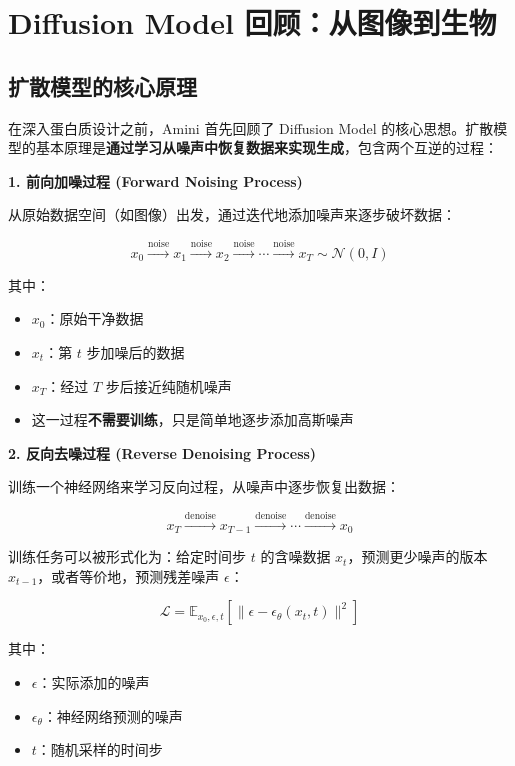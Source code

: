 \section{Diffusion Model 回顾：从图像到生物}

\subsection{扩散模型的核心原理}

在深入蛋白质设计之前，Amini 首先回顾了 Diffusion Model 的核心思想。扩散模型的基本原理是\textbf{通过学习从噪声中恢复数据来实现生成}，包含两个互逆的过程：

\textbf{1. 前向加噪过程 (Forward Noising Process)}

从原始数据空间（如图像）出发，通过迭代地添加噪声来逐步破坏数据：

$$x_0 \xrightarrow{\text{noise}} x_1 \xrightarrow{\text{noise}} x_2 \xrightarrow{\text{noise}} \cdots \xrightarrow{\text{noise}} x_T \sim \mathcal{N}(0, I)$$

其中：
\begin{itemize}
    \item $x_0$：原始干净数据
    \item $x_t$：第 $t$ 步加噪后的数据
    \item $x_T$：经过 $T$ 步后接近纯随机噪声
    \item 这一过程\textbf{不需要训练}，只是简单地逐步添加高斯噪声
\end{itemize}

\textbf{2. 反向去噪过程 (Reverse Denoising Process)}

训练一个神经网络来学习反向过程，从噪声中逐步恢复出数据：

$$x_T \xrightarrow{\text{denoise}} x_{T-1} \xrightarrow{\text{denoise}} \cdots \xrightarrow{\text{denoise}} x_0$$

训练任务可以被形式化为：给定时间步 $t$ 的含噪数据 $x_t$，预测更少噪声的版本 $x_{t-1}$，或者等价地，预测残差噪声 $\epsilon$：

$$\mathcal{L} = \mathbb{E}_{x_0, \epsilon, t} \left[ \| \epsilon - \epsilon_\theta(x_t, t) \|^2 \right]$$

其中：
\begin{itemize}
    \item $\epsilon$：实际添加的噪声
    \item $\epsilon_\theta$：神经网络预测的噪声
    \item $t$：随机采样的时间步
\end{itemize}

